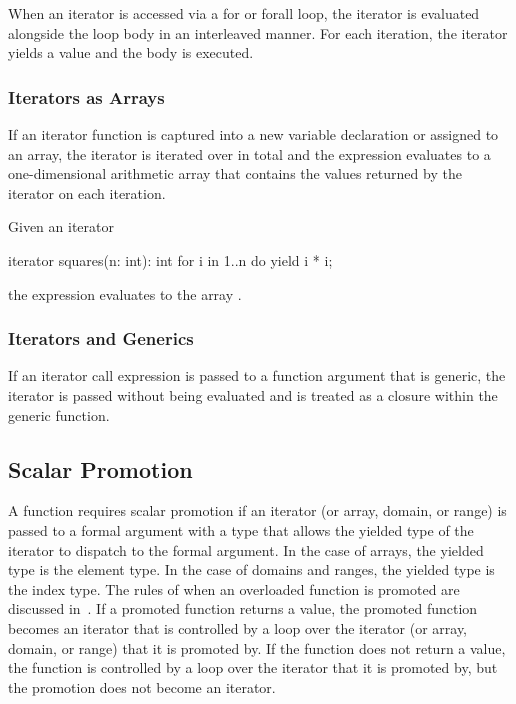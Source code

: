 When an iterator is accessed via a for or forall loop, the iterator is
evaluated alongside the loop body in an interleaved manner.  For each
iteration, the iterator yields a value and the body is executed.

\subsubsection{Iterators as Arrays}
\label{Iterators_as_Arrays}

If an iterator function is captured into a new variable declaration or
assigned to an array, the iterator is iterated over in total and the
expression evaluates to a one-dimensional arithmetic array that
contains the values returned by the iterator on each iteration.
\begin{example}
Given an iterator
\begin{chapel}
iterator squares(n: int): int {
  for i in 1..n do
    yield i * i;
}
\end{chapel}
the expression  evaluates to the array .
\end{example}

\subsubsection{Iterators and Generics}
\label{Iterators_and_Generics}

If an iterator call expression is passed to a function argument that
is generic, the iterator is passed without being evaluated and is
treated as a closure within the generic function.

\subsection{Scalar Promotion}
\label{Scalar_Promotion}

A function requires scalar promotion if an iterator (or array, domain,
or range) is passed to a formal argument with a type that allows the
yielded type of the iterator to dispatch to the formal argument.  In
the case of arrays, the yielded type is the element type.  In the case
of domains and ranges, the yielded type is the index type.  The rules
of when an overloaded function is promoted are discussed
in~.  If a promoted function returns a
value, the promoted function becomes an iterator that is controlled by
a loop over the iterator (or array, domain, or range) that it is
promoted by.  If the function does not return a value, the function is
controlled by a loop over the iterator that it is promoted by, but the
promotion does not become an iterator.

